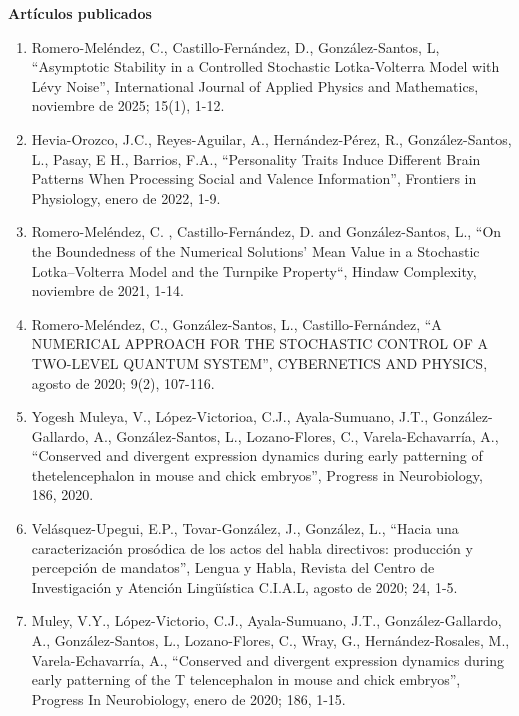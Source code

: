 {\large \textbf{Artículos publicados}}

\hrulefill

\begin{enumerate}

\item Romero-Meléndez, C., Castillo-Fernández, D., González-Santos, L, “Asymptotic Stability in a Controlled 
Stochastic Lotka-Volterra Model with Lévy Noise”, International Journal of Applied Physics and Mathematics, 
noviembre de 2025; 15(1), 1-12.

\item Hevia-Orozco, J.C., Reyes-Aguilar, A., Hernández-Pérez, R., González-Santos, L., Pasay, E H., Barrios, 
F.A., 
“Personality Traits Induce Different Brain Patterns When Processing Social and Valence Information”, Frontiers 
in Physiology, enero de 2022, 1-9.

\item Romero-Meléndez, C. , Castillo-Fernández, D. and González-Santos, L., “On the Boundedness of the 
Numerical 
Solutions’ Mean Value in a Stochastic Lotka–Volterra Model and the Turnpike Property“, Hindaw Complexity, 
noviembre de 2021, 1-14.

\item Romero-Meléndez, C., González-Santos, L., Castillo-Fernández, “A NUMERICAL APPROACH FOR THE STOCHASTIC 
CONTROL 
OF A TWO-LEVEL QUANTUM SYSTEM”, CYBERNETICS AND PHYSICS, agosto de 2020; 9(2), 107-116.

\item Yogesh Muleya, V., López-Victorioa, C.J., Ayala-Sumuano, J.T., González-Gallardo, A., González-Santos, 
L., 
Lozano-Flores, C., Varela-Echavarría, A., “Conserved and divergent expression dynamics during early patterning 
of thetelencephalon in mouse and chick embryos”, Progress in Neurobiology, 186, 2020.

\item Velásquez-Upegui, E.P., Tovar-González, J., González, L., “Hacia una caracterización prosódica de los 
actos 
del habla directivos: producción y percepción de mandatos”, Lengua y Habla, Revista del Centro de 
Investigación y Atención Lingüística C.I.A.L, agosto de 2020; 24, 1-5.

\item Muley, V.Y., López-Victorio, C.J., Ayala-Sumuano, J.T., González-Gallardo, A., González-Santos, L., 
Lozano-Flores, C., Wray, G., Hernández-Rosales, M., Varela-Echavarría, A., “Conserved and divergent expression 
dynamics during early patterning of the T telencephalon in mouse and chick embryos”, Progress In Neurobiology, 
enero de 2020; 186, 1-15.


\end{enumerate}
